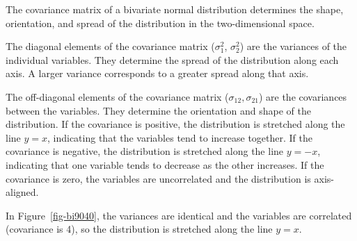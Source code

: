 \documentclass[
  letterpaper,
  DIV=11,
  numbers=noendperiod]{scrreprt}
\begin{document}
The covariance matrix of a bivariate normal distribution determines the
shape, orientation, and spread of the distribution in the
two-dimensional space.

The diagonal elements of the covariance matrix (\(\sigma_1^2\),
\(\sigma_2^2\)) are the variances of the individual variables. They
determine the spread of the distribution along each axis. A larger
variance corresponds to a greater spread along that axis.

The off-diagonal elements of the covariance matrix
(\(\sigma_{12}, \sigma_{21}\)) are the covariances between the
variables. They determine the orientation and shape of the distribution.
If the covariance is positive, the distribution is stretched along the
line \(y=x\), indicating that the variables tend to increase together.
If the covariance is negative, the distribution is stretched along the
line \(y=-x\), indicating that one variable tends to decrease as the
other increases. If the covariance is zero, the variables are
uncorrelated and the distribution is axis-aligned.

In Figure~\ref{fig-bi9040}, the variances are identical and the
variables are correlated (covariance is 4), so the distribution is
stretched along the line \(y=x\).
\end{document}
